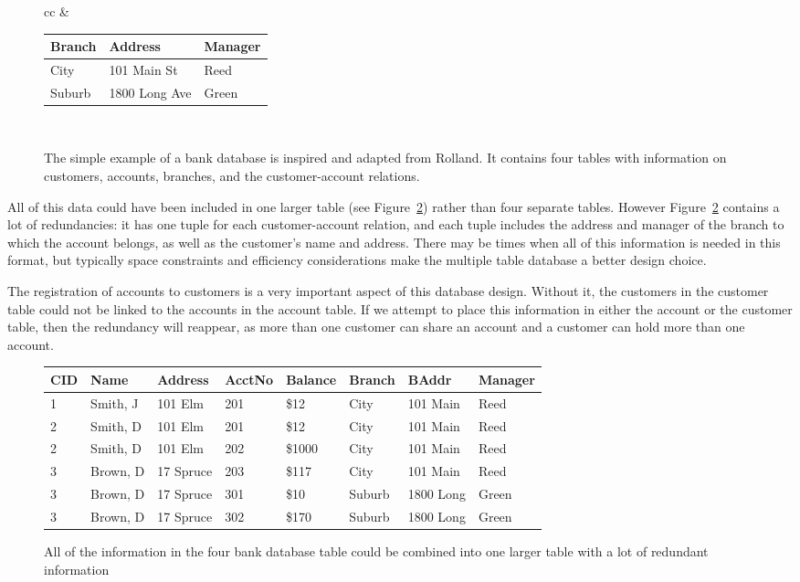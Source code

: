 \begin{figure}
\begin{tabular}{cc}
&

\begin{tabular}{|lll|}
\hline
Branch & Address & Manager\\
\hline
City & 101 Main St & Reed \\
Suburb & 1800 Long Ave & Green\\
\hline
\end{tabular}

\\
\end{tabular}

\caption{The simple example of a bank database is inspired and adapted
from Rolland. It contains four tables with information on customers,
accounts, branches, and the customer-account relations.}\label{dbms:table:bankTables}
\end{figure}

All of this data could have been included in one larger 
table (see Figure~\ref{dbms:table:bigbank}) rather than four separate tables.
However Figure~\ref{dbms:table:bigbank} contains a lot of redundancies:
it has one tuple for each customer-account relation, and 
each tuple includes the address and manager of the branch to which the account
belongs, as well as the customer's name and address.
There may be times when all of this information is needed in this format,
but typically space constraints and efficiency considerations
make the multiple table database a better design choice. 

The registration of accounts to customers is a very important aspect 
of this database design. 
Without it, the customers in the customer table could not be 
linked to the accounts in the account table.
If we attempt to place this information in either the account or the 
customer table, then the redundancy will reappear, as more than one 
customer can share an account and a customer can hold more than one account.

\begin{figure}
\small{
\begin{tabular}{|llllllll|}
\hline
CID & Name & Address & AcctNo & Balance & Branch & BAddr & Manager \\
\hline
 1 & Smith, J  & 101 Elm & 201 & \$12 & City & 101 Main & Reed \\
 2 & Smith, D & 101 Elm & 201 & \$12 &  City & 101 Main & Reed \\
 2 & Smith, D & 101 Elm  & 202 & \$1000 & City & 101 Main & Reed \\
 3 & Brown, D & 17 Spruce & 203 & \$117 & City & 101 Main & Reed\\
 3 & Brown, D & 17 Spruce & 301 & \$10 & Suburb & 1800 Long & Green \\
 3 & Brown, D & 17 Spruce & 302 & \$170 & Suburb & 1800 Long & Green\\
\hline
\end{tabular}
}
\caption{All of the information in the four bank database table could
be combined into one larger table with a lot of redundant information}\label{dbms:table:bigbank}
\end{figure}

